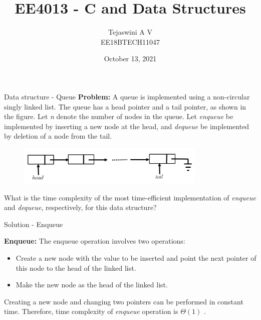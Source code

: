 \documentclass{beamer}
\title{EE4013 - C and Data Structures} %
\author{} %
\author{Tejaswini A V \\ EE18BTECH11047}
\date{October 13, 2021}
\begin{document}
{
\begin{frame}
\titlepage
\end{frame}
}

\begin{frame}{Data structure - Queue}
\textbf{Problem: } A queue is implemented using a non-circular singly linked list. The queue has a head pointer and a tail pointer, as shown in the figure. Let \emph{n} denote the number of nodes in the queue. Let \emph{enqueue} be implemented by inserting a new node at the head, and \emph{dequeue} be implemented by deletion of a node from the tail.

\begin{figure}[!ht]
    \begin{center}
    \includegraphics[width=90mm,scale=1]{figs/queue}
    \end{center}
    \label{fig:roc}	
\end{figure}

What is the time complexity of the most time-efficient implementation of \emph{enqueue} and \emph{dequeue}, respectively, for this data structure?
\end{frame}

\begin{frame}{Solution - Enqueue}

\textbf{Enqueue:} The enqueue operation involves two operations:
\begin{itemize}
    \item Create a new node with the value to be inserted and point the next pointer of this node to the head of the linked list.
    \item Make the new node as the head of the linked list.
\end{itemize}
Creating a new node and changing two pointers can be performed in constant time. Therefore, time complexity of \emph{enqueue} operation is $\Theta (1)$ .
    
\end{frame}
\end{document}
